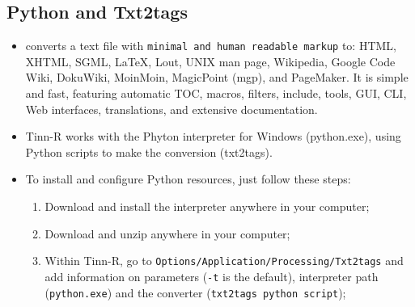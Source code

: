 \subsection{Python and Txt2tags}

\begin{itemize}
  \item {}
    converts a text file with \texttt{minimal and human readable markup} to:
    HTML, XHTML, SGML, LaTeX, Lout, UNIX man page, Wikipedia, Google Code Wiki,
    DokuWiki, MoinMoin, MagicPoint (mgp), and PageMaker. It is simple and fast,
    featuring automatic TOC, macros, filters, include, tools, GUI, CLI,
    Web interfaces, translations, and extensive documentation.

  \item Tinn-R works with the Phyton interpreter for Windows (python.exe), using
    Python scripts to make the conversion (txt2tags).

  \item To install and configure Python resources, just follow these steps:
    \begin{enumerate}
      \item Download and install the
        interpreter anywhere in your computer;
      \item Download and unzip
        anywhere in your computer;
      \item Within Tinn-R, go to \texttt{Options/Application/Processing/Txt2tags}
        and add information on parameters (\texttt{-t} is the default),
        interpreter path (\texttt{python.exe}) and the
        converter (\texttt{txt2tags python script});\\


\end{enumerate}
\end{itemize}
